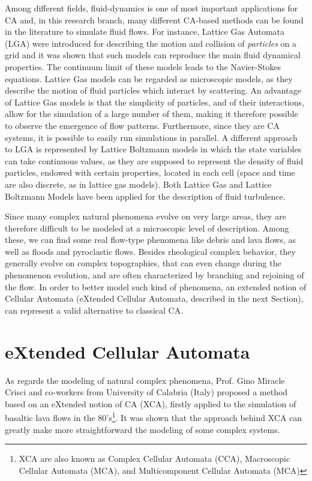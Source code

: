 Among different fields, fluid-dynamics is one of most important
applications for CA and, in this research branch, many different
CA-based methods can be found in the literature to simulate fluid
flows.  For instance, Lattice Gas Automata (LGA) were introduced for
describing the motion and collision of \emph{particles} on a grid and
it was shown that such models can reproduce the main fluid dynamical
properties. The continuum limit of these models leads to the
Navier-Stokes equations. Lattice Gas models can be regarded as
microscopic models, as they describe the motion of fluid particles
which interact by scattering. An advantage of Lattice Gas models is
that the simplicity of particles, and of their interactions, allow for
the simulation of a large number of them, making it therefore possible
to observe the emergence of flow patterns. Furthermore, since they are
CA systems, it is possible to easily run simulations in parallel. A
different approach to LGA is represented by Lattice Boltzmann models
in which the state variables can take continuous values, as they are
supposed to represent the density of fluid particles, endowed with
certain properties, located in each cell (space and time are also
discrete, as in lattice gas models). Both Lattice Gas and Lattice
Boltzmann Models have been applied for the description of fluid
turbulence.

Since many complex natural phenomena evolve on very large areas, they
are therefore difficult to be modeled at a microscopic level of
description. Among these, we can find some real flow-type phenomena
like debris and lava flows, as well as floods and pyroclastic
flows. Besides rheological complex behavior, they generally evolve on
complex topographies, that can even change during the phenomenon
evolution, and are often characterized by branching and rejoining of
the flow. In order to better model such kind of phenomena, an extended
notion of Cellular Automata (eXtended Cellular Automata, described in
the next Section), can represent a valid alternative to classical CA.

\section{eXtended Cellular Automata}

As regards the modeling of natural complex phenomena, Prof. Gino
Miracle Crisci and co-workers from University of Calabria (Italy)
proposed a method based on an eXtended notion of CA (XCA), firstly
applied to the simulation of basaltic lava flows in the
80's\footnote{XCA are also known as Complex Cellular Automata (CCA),
  Macroscopic Cellular Automata (MCA), and Multicomponent Cellular
  Automata (MCA)}. It was shown that the approach behind XCA can
greatly make more straightforward the modeling of some complex
systems.


